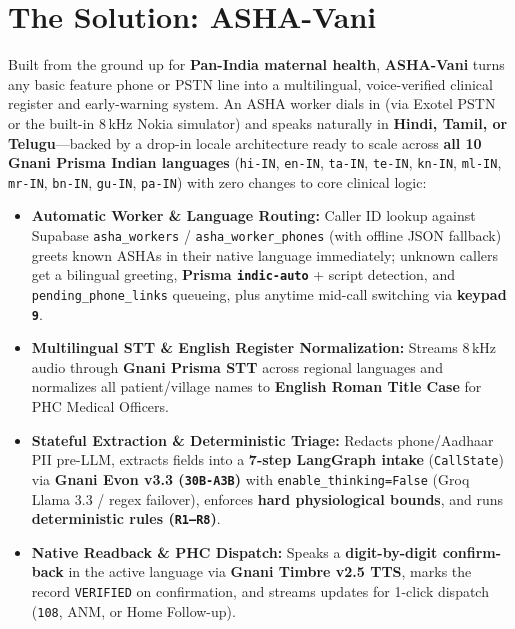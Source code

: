 \documentclass[9pt,a4paper,twocolumn]{article}
\begin{document}
\section{The Solution: ASHA-Vani}
Built from the ground up for \textbf{Pan-India maternal health}, \textbf{ASHA-Vani} turns any basic feature phone or PSTN line into a multilingual, voice-verified clinical register and early-warning system. An ASHA worker dials in (via Exotel PSTN or the built-in 8\,kHz Nokia simulator) and speaks naturally in \textbf{Hindi, Tamil, or Telugu}—backed by a drop-in locale architecture ready to scale across \textbf{all 10 Gnani Prisma Indian languages} (\texttt{hi-IN}, \texttt{en-IN}, \texttt{ta-IN}, \texttt{te-IN}, \texttt{kn-IN}, \texttt{ml-IN}, \texttt{mr-IN}, \texttt{bn-IN}, \texttt{gu-IN}, \texttt{pa-IN}) with zero changes to core clinical logic:
\begin{itemize}
  \item \textbf{Automatic Worker \& Language Routing:} Caller ID lookup against Supabase \texttt{asha\_workers} / \texttt{asha\_worker\_phones} (with offline JSON fallback) greets known ASHAs in their native language immediately; unknown callers get a bilingual greeting, \textbf{Prisma \texttt{indic-auto}} + script detection, and \texttt{pending\_phone\_links} queueing, plus anytime mid-call switching via \textbf{keypad \texttt{9}}.
  \item \textbf{Multilingual STT \& English Register Normalization:} Streams 8\,kHz audio through \textbf{Gnani Prisma STT} across regional languages and normalizes all patient/village names to \textbf{English Roman Title Case} for PHC Medical Officers.
  \item \textbf{Stateful Extraction \& Deterministic Triage:} Redacts phone/Aadhaar PII pre-LLM, extracts fields into a \textbf{7-step LangGraph intake} (\texttt{CallState}) via \textbf{Gnani Evon v3.3 (\texttt{30B-A3B})} with \texttt{enable\_thinking=False} (Groq Llama 3.3 / regex failover), enforces \textbf{hard physiological bounds}, and runs \textbf{deterministic rules (\texttt{R1--R8})}.
  \item \textbf{Native Readback \& PHC Dispatch:} Speaks a \textbf{digit-by-digit confirm-back} in the active language via \textbf{Gnani Timbre v2.5 TTS}, marks the record \texttt{VERIFIED} on confirmation, and streams updates for 1-click dispatch (\texttt{108}, ANM, or Home Follow-up).
\end{itemize}
\end{document}
